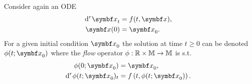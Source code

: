 Consider again an ODE
\begin{equation}
  \label{eq:ode_sensitivity}
  \begin{aligned}
    \mathrm{d}^r \x_t & = f(t, \x), \\
    \x(0)             & = \x_{0}.
  \end{aligned}
\end{equation}
For a given initial condition $\x_{0}$ the solution at time $t \geq 0$ can be denoted $\phi(t; \x_{0})$ where the \emph{flow} operator $\phi : \mathbb{R} \times \mathbb{M} \rightarrow \mathbb{M}$ is s.t.
\begin{equation}
  \begin{aligned}
    \phi(0; \x_{0})                    & = \x_{0},                            \\
    \mathrm{d}^{r} \phi(t; \x_{0})_{t} & = f\left(t, \phi(t; \x_{0}) \right).
  \end{aligned}
\end{equation}

